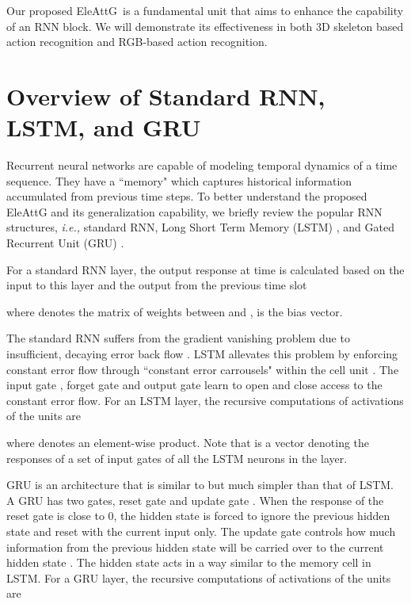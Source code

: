 \documentclass[runningheads]{llncs}
\newcommand{\EleAttG}{{EleAttG~}}
\begin{document}
{	Our proposed \EleAttG is a fundamental unit that aims to enhance the capability of an RNN block. We will demonstrate its effectiveness in both 3D skeleton based action recognition and RGB-based action recognition. 
	
	\section{Overview of Standard RNN, LSTM, and GRU}
	\label{sec:RNN} 
	Recurrent neural networks are capable of modeling temporal dynamics of a time sequence. They have a ``memory" which captures historical information accumulated from previous time steps. To better understand the proposed EleAttG and its generalization capability, we briefly review the popular RNN structures, {\it i.e.,} standard RNN, Long Short Term Memory (LSTM) \cite{hochreiter1997long}, and Gated Recurrent Unit (GRU) \cite{cho2014learning}.
	
	For a standard RNN layer, the output response  at time  is calculated based on the input  to this layer and the output  from the previous time slot

	
	where  denotes the matrix of weights between  and ,  is the bias vector.
	
	\begin{comment}
	
	\end{comment}
	
	The standard RNN suffers from the gradient vanishing problem due to insufficient, decaying error back flow \cite{hochreiter1997long}. LSTM allevates this problem by enforcing constant error flow through ``constant error carrousels" within the cell unit . The input gate , forget gate  and output gate  learn to open and close access to the constant error flow. For an LSTM layer, the recursive computations of activations of the units are
	
	where  denotes an element-wise product. Note that  is a vector denoting the responses of a set of input gates of all the LSTM neurons in the layer.
	
	GRU is an architecture that is similar to but much simpler than that of LSTM. A GRU has two gates, reset gate  and update gate . When the response of the reset gate is close to 0, the hidden state  is forced to ignore the previous hidden state and reset with the current input only. The update gate controls how much information from the previous hidden state will be carried over to the current hidden state . The hidden state acts in a way similar to the memory cell in LSTM. For a GRU layer, the recursive computations of activations of the units are
	
}
\end{document}
